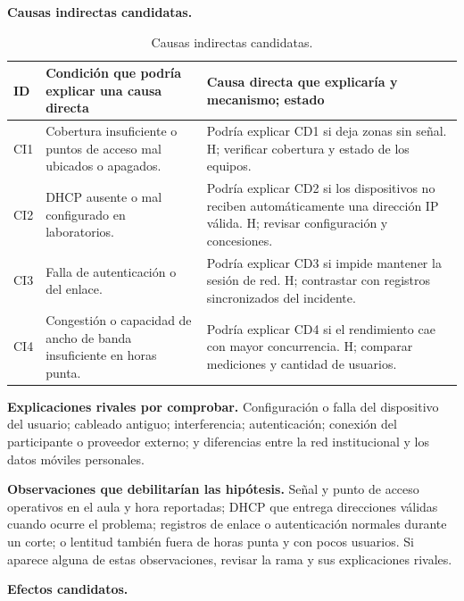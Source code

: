 	\textbf{Causas indirectas candidatas.}

	\begin{table}[H]
		\centering
		\caption{Causas indirectas candidatas.}
		\begin{tabular}{C{1.2cm}T{4.7cm}T{8.6cm}}
			\hline
			\textbf{ID} & \textbf{Condición que podría explicar una causa directa} & \textbf{Causa directa que explicaría y mecanismo; estado} \bigstrut\\
			\hline
			CI1 & Cobertura insuficiente o puntos de acceso mal ubicados o apagados. & Podría explicar CD1 si deja zonas sin señal. H; verificar cobertura y estado de los equipos. \\
			CI2 & DHCP ausente o mal configurado en laboratorios. & Podría explicar CD2 si los dispositivos no reciben automáticamente una dirección IP válida. H; revisar configuración y concesiones. \\
			CI3 & Falla de autenticación o del enlace. & Podría explicar CD3 si impide mantener la sesión de red. H; contrastar con registros sincronizados del incidente. \\
			CI4 & Congestión o capacidad de ancho de banda insuficiente en horas punta. & Podría explicar CD4 si el rendimiento cae con mayor concurrencia. H; comparar mediciones y cantidad de usuarios. \\
			\hline
		\end{tabular}
		\label{tab:causas-indirectas}
	\end{table}

	\textbf{Explicaciones rivales por comprobar.} Configuración o falla del dispositivo del usuario; cableado antiguo; interferencia; autenticación; conexión del participante o proveedor externo; y diferencias entre la red institucional y los datos móviles personales.

	\textbf{Observaciones que debilitarían las hipótesis.} Señal y punto de acceso operativos en el aula y hora reportadas; DHCP que entrega direcciones válidas cuando ocurre el problema; registros de enlace o autenticación normales durante un corte; o lentitud también fuera de horas punta y con pocos usuarios. Si aparece alguna de estas observaciones, revisar la rama y sus explicaciones rivales.

	\textbf{Efectos candidatos.}

